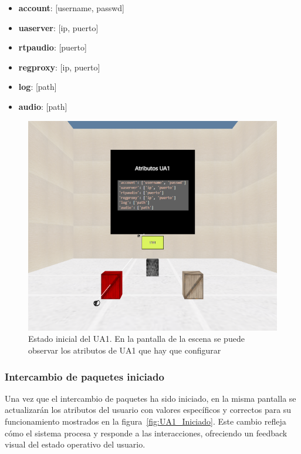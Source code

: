 \documentclass[a4paper, 12pt]{book}
\begin{document}
\begin{itemize}
  \item \textbf{account}: [username, passwd]
  \item \textbf{uaserver}: [ip, puerto]
  \item \textbf{rtpaudio}: [puerto]
  \item \textbf{regproxy}: [ip, puerto]
  \item \textbf{log}: [path]
  \item \textbf{audio}: [path]
\end{itemize}

\begin{figure}
  \centering
  \includegraphics[width=15cm, keepaspectratio]{img/resultados/UA1_NoIniciado.png}
  \caption{Estado inicial del UA1. En la pantalla de la escena se puede observar los atributos de UA1 que hay que configurar}
  \label{fig:UA1_NoIniciado}
\end{figure}


\subsubsection{Intercambio de paquetes iniciado}
\label{subsubsec:Intercambio_Iniciado}
Una vez que el intercambio de paquetes ha sido iniciado, en la misma pantalla se 
actualizarán los atributos del usuario con valores específicos y correctos para su funcionamiento mostrados en la figura~\ref{fig:UA1_Iniciado}.  
Este cambio refleja cómo el sistema procesa y responde a las interacciones, ofreciendo un feedback visual del estado operativo del usuario.
\end{document}
